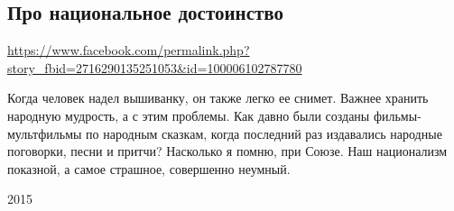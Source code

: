  
 
 
 
 

\subsection{Про национальное достоинство}
\label{sec:03_06_2020.fb.zharkih_denis.1.patriotizm}
\url{https://www.facebook.com/permalink.php?story_fbid=2716290135251053&id=100006102787780}

Когда человек надел вышиванку, он также легко ее снимет. Важнее хранить
народную мудрость, а с этим проблемы. Как давно были созданы фильмы-мультфильмы
по народным сказкам, когда последний раз издавались народные поговорки, песни и
притчи? Насколько я помню, при Союзе. Наш национализм показной, а самое
страшное, совершенно неумный.

2015
